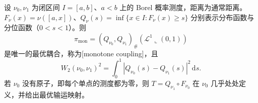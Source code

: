 \begin{theorem}\label{g3:thm:C-quantile-transport}
	设 \(\nu_0,\nu_1\) 为闭区间 \(I=[a,b]\)、\(a<b\) 上的 Borel 概率测度，距离为通常距离。\(F_\nu(x)=\nu([a,x])\)、\(Q_\nu(s)=\inf\{x\in I:F_\nu(x)\ge s\}\) 分别表示分布函数与分位函数（\(0<s<1\)）。则
	\[
		\pi_{\mathrm{mon}}=(Q_{\nu_0},Q_{\nu_1})_\#
		                     (\mathcal L^1\llcorner(0,1))
	\]
	是唯一的最优耦合，称为[monotone coupling]，且
	\begin{equation}\label{g3:eq:C-quantile-wasserstein}
		W_2(\nu_0,\nu_1)^2
		=\int_0^1|Q_{\nu_0}(s)-Q_{\nu_1}(s)|^2\,\mathrm ds.
	\end{equation}
	若 \(\nu_0\) 没有原子，即每个单点的测度都为零，则
	\(T=Q_{\nu_1}\circ F_{\nu_0}\) 在 \(\nu_0\) 几乎处处定义，并给出最优输运映射。
\end{theorem}
